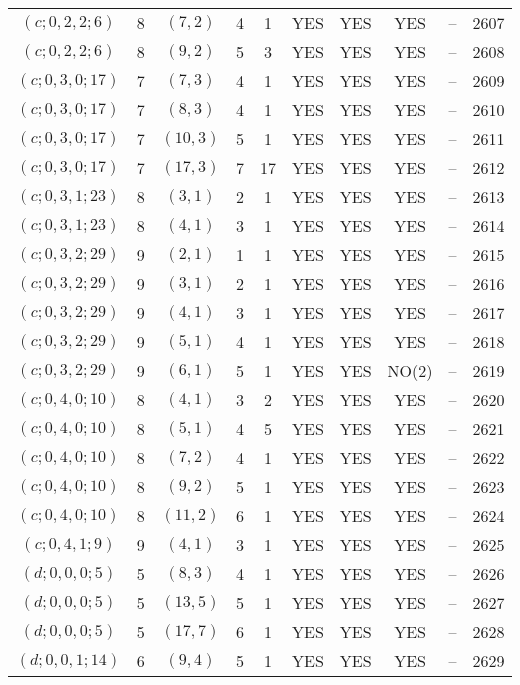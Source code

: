 \begin{longtable}{|c|c|c|c|c|c|c|c|c|c|}
$(c; 0, 2, 2; 6)$ & 8 & $(7, 2)$ & 4 & 1 & YES & YES & YES & -- & 2607\\
$(c; 0, 2, 2; 6)$ & 8 & $(9, 2)$ & 5 & 3 & YES & YES & YES & -- & 2608\\
$(c; 0, 3, 0; 17)$ & 7 & $(7, 3)$ & 4 & 1 & YES & YES & YES & -- & 2609\\
$(c; 0, 3, 0; 17)$ & 7 & $(8, 3)$ & 4 & 1 & YES & YES & YES & -- & 2610\\
$(c; 0, 3, 0; 17)$ & 7 & $(10, 3)$ & 5 & 1 & YES & YES & YES & -- & 2611\\
$(c; 0, 3, 0; 17)$ & 7 & $(17, 3)$ & 7 & 17 & YES & YES & YES & -- & 2612\\
$(c; 0, 3, 1; 23)$ & 8 & $(3, 1)$ & 2 & 1 & YES & YES & YES & -- & 2613\\
$(c; 0, 3, 1; 23)$ & 8 & $(4, 1)$ & 3 & 1 & YES & YES & YES & -- & 2614\\
$(c; 0, 3, 2; 29)$ & 9 & $(2, 1)$ & 1 & 1 & YES & YES & YES & -- & 2615\\
$(c; 0, 3, 2; 29)$ & 9 & $(3, 1)$ & 2 & 1 & YES & YES & YES & -- & 2616\\
$(c; 0, 3, 2; 29)$ & 9 & $(4, 1)$ & 3 & 1 & YES & YES & YES & -- & 2617\\
$(c; 0, 3, 2; 29)$ & 9 & $(5, 1)$ & 4 & 1 & YES & YES & YES & -- & 2618\\
$(c; 0, 3, 2; 29)$ & 9 & $(6, 1)$ & 5 & 1 & YES & YES & NO(2) & -- & 2619\\
$(c; 0, 4, 0; 10)$ & 8 & $(4, 1)$ & 3 & 2 & YES & YES & YES & -- & 2620\\
$(c; 0, 4, 0; 10)$ & 8 & $(5, 1)$ & 4 & 5 & YES & YES & YES & -- & 2621\\
$(c; 0, 4, 0; 10)$ & 8 & $(7, 2)$ & 4 & 1 & YES & YES & YES & -- & 2622\\
$(c; 0, 4, 0; 10)$ & 8 & $(9, 2)$ & 5 & 1 & YES & YES & YES & -- & 2623\\
$(c; 0, 4, 0; 10)$ & 8 & $(11, 2)$ & 6 & 1 & YES & YES & YES & -- & 2624\\
$(c; 0, 4, 1; 9)$ & 9 & $(4, 1)$ & 3 & 1 & YES & YES & YES & -- & 2625\\
$(d; 0, 0, 0; 5)$ & 5 & $(8, 3)$ & 4 & 1 & YES & YES & YES & -- & 2626\\
$(d; 0, 0, 0; 5)$ & 5 & $(13, 5)$ & 5 & 1 & YES & YES & YES & -- & 2627\\
$(d; 0, 0, 0; 5)$ & 5 & $(17, 7)$ & 6 & 1 & YES & YES & YES & -- & 2628\\
$(d; 0, 0, 1; 14)$ & 6 & $(9, 4)$ & 5 & 1 & YES & YES & YES & -- & 2629\\

\end{longtable}
